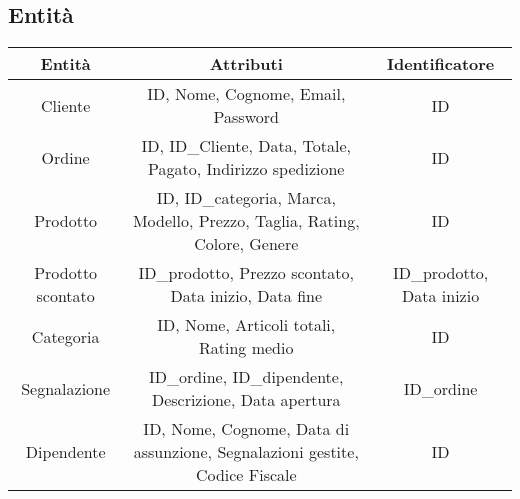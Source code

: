 \subsection{Entità}
\begin{center}
\begin{tabular}{ |c|c|c|} 
\hline
Entità & Attributi & Identificatore \\
\hline
\multirow{4}{6em}{Cliente} & \multirow{4}{8em}{ID, Nome, Cognome, Email, Password} & \multirow{4}{12em}{ID} \\
 &  & \\
 &  & \\
 &  & \\
\hline

\multirow{4}{6em}{Ordine} & \multirow{4}{8em}{ID, ID\_Cliente, Data, Totale, Pagato, Indirizzo spedizione} & \multirow{4}{12em}{ID} \\
 &  & \\
 &  & \\
 &  & \\
\hline

\multirow{5}{6em}{Prodotto} & \multirow{5}{8em}{ID, ID\_categoria, Marca, Modello, Prezzo, Taglia, Rating, Colore, Genere} & \multirow{5}{12em}{ID} \\
 &  & \\
 &  & \\
 &  & \\
 &  & \\
\hline

\multirow{4}{6em}{Prodotto scontato} & \multirow{4}{8em}{ID\_prodotto, Prezzo scontato, Data inizio, Data fine} & \multirow{4}{12em}{ID\_prodotto, Data inizio} \\
 &  & \\
 &  & \\
 &  & \\
\hline

\multirow{3}{6em}{Categoria} & \multirow{3}{8em}{ID, Nome, Articoli totali, Rating medio} & \multirow{3}{12em}{ID} \\
 &  & \\
 &  & \\ 
\hline

\multirow{5}{6em}{Segnalazione} & \multirow{5}{8em}{ ID\_ordine, ID\_dipendente, Descrizione, Data apertura} & \multirow{5}{12em}{ID\_ordine} \\
 &  & \\
 &  & \\
 &  & \\
 &  & \\
\hline

\multirow{6}{6em}{Dipendente} & \multirow{6}{8em}{ID, Nome, Cognome, Data di assunzione, Segnalazioni gestite, Codice Fiscale} & \multirow{6}{12em}{ID} \\
&  & \\
&  & \\
&  & \\
&  & \\
&  & \\
\hline
\end{tabular}
\end{center}